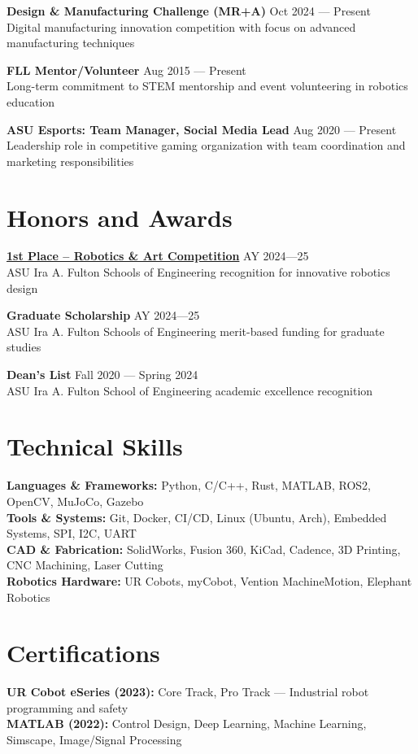 \documentclass[10pt]{article}
\begin{document}
\textbf{Design \& Manufacturing Challenge (MR+A)} \hfill Oct 2024 --- Present\\
Digital manufacturing innovation competition with focus on advanced manufacturing techniques

\textbf{FLL Mentor/Volunteer} \hfill Aug 2015 --- Present\\
Long-term commitment to STEM mentorship and event volunteering in robotics education

\textbf{ASU Esports: Team Manager, Social Media Lead} \hfill Aug 2020 --- Present \\
Leadership role in competitive gaming organization with team coordination and marketing responsibilities

\section*{Honors and Awards}
\textbf{\href{https://www.linkedin.com/posts/mhgross_asuengineering-design-robotics-activity-7324315472491855873-Gn_C}{1st Place -- Robotics \& Art Competition}} \hfill AY 2024---25 \\
ASU Ira A. Fulton Schools of Engineering recognition for innovative robotics design

\textbf{Graduate Scholarship} \hfill AY 2024---25 \\
ASU Ira A. Fulton Schools of Engineering merit-based funding for graduate studies

\textbf{Dean's List} \hfill Fall 2020 --- Spring 2024 \\
ASU Ira A. Fulton School of Engineering academic excellence recognition

\section*{Technical Skills}
\textbf{Languages \& Frameworks:} Python, C/C++, Rust, MATLAB, ROS2, OpenCV, MuJoCo, Gazebo \\
\textbf{Tools \& Systems:} Git, Docker, CI/CD, Linux (Ubuntu, Arch), Embedded Systems, SPI, I2C, UART \\
\textbf{CAD \& Fabrication:} SolidWorks, Fusion 360, KiCad, Cadence, 3D Printing, CNC Machining, Laser Cutting \\
\textbf{Robotics Hardware:} UR Cobots, myCobot, Vention MachineMotion, Elephant Robotics

\section*{Certifications}
\textbf{UR Cobot eSeries (2023):} Core Track, Pro Track --- Industrial robot programming and safety \\
\textbf{MATLAB (2022):} Control Design, Deep Learning, Machine Learning, Simscape, Image/Signal Processing
\end{document}
